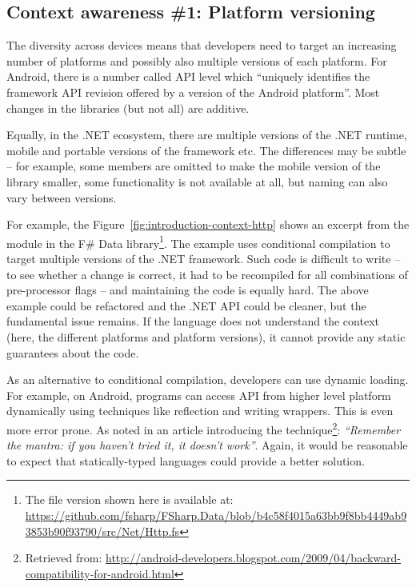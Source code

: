 
\subsection{Context awareness \#1: Platform versioning}

The diversity across devices means that developers need to target an increasing number of platforms
and possibly also multiple versions of each platform. For Android, there is a number called 
API level \cite{app-android-apilevel} which ``uniquely identifies the framework API revision offered 
by a version of the Android platform''. Most changes in the libraries (but not all) are additive.

Equally, in the .NET ecosystem, there are multiple versions of the .NET runtime, mobile and 
portable versions of the framework etc. The differences may be subtle -- for example, some members
are omitted to make the mobile version of the library smaller, some functionality is not available
at all, but naming can also vary between versions.

For example, the Figure~\ref{fig:introduction-context-http} shows an excerpt from the  module 
in the F\# Data library\footnote{The file version shown here is available at:
\url{https://github.com/fsharp/FSharp.Data/blob/b4c58f4015a63bb9f8bb4449ab93853b90f93790/src/Net/Http.fs}}.
The example uses conditional compilation to target multiple versions of the .NET framework. Such code
is difficult to write -- to see whether a change is correct, it had to be recompiled for all combinations
of pre-processor flags -- and maintaining the code is equally hard. The above example could be refactored
and the .NET API could be cleaner, but the fundamental issue remains. If the language does not understand
the context (here, the different platforms and platform versions), it cannot provide any static
guarantees about the code.

As an alternative to conditional compilation, developers can use dynamic loading. For example, 
on Android, programs can access API from higher level platform dynamically using techniques like 
reflection and writing wrappers. This is even more error prone. As noted in an article introducing
the technique\footnote{Retrieved from: \url{http://android-developers.blogspot.com/2009/04/backward-}\\\url{compatibility-for-android.html}}:
\emph{``Remember the mantra: if you haven't tried it, it doesn't work''}. Again, it would be 
reasonable to expect that statically-typed languages could provide a better solution.


